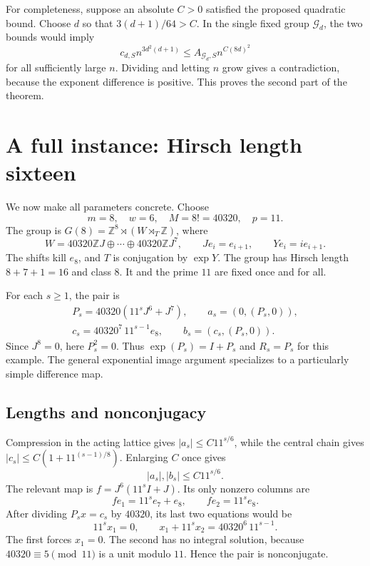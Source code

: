 \documentclass[11pt]{article}
\numberwithin{equation}{section}
\theoremstyle{definition}
\theoremstyle{remark}
\newcommand{\Z}{\mathbb Z}
\begin{document}
For completeness, suppose an absolute $C>0$ satisfied the proposed quadratic bound. Choose $d$ so that $3(d+1)/64>C$. In the single fixed group $\mathcal G_d$, the two bounds would imply
\[
c_{d,S}n^{3d^2(d+1)}\le A_{\mathcal G_d,S}n^{C(8d)^2}
\]
for all sufficiently large $n$. Dividing and letting $n$ grow gives a contradiction, because the exponent difference is positive. This proves the second part of the theorem.

\section{A full instance: Hirsch length sixteen}\label{sec:instance}
We now make all parameters concrete. Choose
\begin{equation}\label{eq:instanceparameters}
m=8,\quad w=6,\quad M=8!=40320,\quad p=11.
\end{equation}
The group is $G(8)=\Z^8\rtimes(W\rtimes_T\Z)$, where
\[
W=40320\Z J\oplus\cdots\oplus40320\Z J^7,
\qquad Je_i=e_{i+1},\qquad Ye_i=i e_{i+1}.
\]
The shifts kill $e_8$, and $T$ is conjugation by $\exp Y$. The group has Hirsch length $8+7+1=16$ and class $8$. It and the prime $11$ are fixed once and for all.

For each $s\ge1$, the pair is
\begin{equation}\label{eq:instancepair}
\begin{gathered}
P_s=40320(11^sJ^6+J^7),\qquad
a_s=(0,(P_s,0)),\\
c_s=40320^7\,11^{s-1}e_8,\qquad b_s=(c_s,(P_s,0)).
\end{gathered}
\end{equation}
Since $J^8=0$, here $P_s^2=0$. Thus $\exp(P_s)=I+P_s$ and $R_s=P_s$ for this example. The general exponential image argument specializes to a particularly simple difference map.

\subsection{Lengths and nonconjugacy}
Compression in the acting lattice gives $|a_s|\le C11^{s/6}$, while the central chain gives $|c_s|\le C(1+11^{(s-1)/8})$. Enlarging $C$ once gives
\begin{equation}\label{eq:instancelength}
|a_s|,|b_s|\le C11^{s/6}.
\end{equation}
The relevant map is $f=J^6(11^sI+J)$. Its only nonzero columns are
\[
fe_1=11^s e_7+e_8,\qquad fe_2=11^s e_8.
\]
After dividing $P_sx=c_s$ by $40320$, its last two equations would be
\[
11^s x_1=0,\qquad x_1+11^s x_2=40320^6\,11^{s-1}.
\]
The first forces $x_1=0$. The second has no integral solution, because $40320\equiv5\pmod{11}$ is a unit modulo $11$. Hence the pair is nonconjugate.
\end{document}
